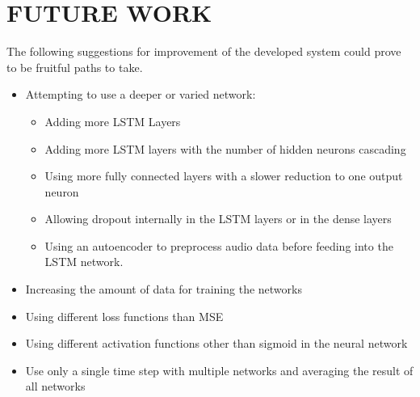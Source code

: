 \section{FUTURE WORK}
The following suggestions for improvement of the developed system could prove to be fruitful paths to take.
\begin{itemize}
	\item Attempting to use a deeper or varied network:
		\begin{itemize}
			\item Adding more LSTM Layers
            \item Adding more LSTM layers with the number of hidden neurons cascading
            \item Using more fully connected layers with a slower reduction to one output neuron
            \item Allowing dropout internally in the LSTM layers or in the dense layers
            \item Using an autoencoder to preprocess audio data before feeding into the LSTM network.
		\end{itemize}
	\item Increasing the amount of data for training the networks
    \item Using different loss functions than MSE
    \item Using different activation functions other than sigmoid in the neural network
    \item Use only a single time step with multiple networks and averaging the result of all networks
\end{itemize}